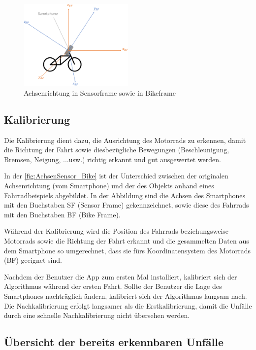 \begin{figure}[htpb]
	\centering
	\includegraphics[width=0.5\textwidth]{Bilder/AchsenSensor_Bike_new_.pdf} 
	\caption{Achsenrichtung in Sensorframe sowie in Bikeframe}
	\label{fig:AchsenSensor_Bike}
\end{figure}
\subsection{Kalibrierung}
Die Kalibrierung dient dazu, die Ausrichtung des Motorrads zu erkennen, damit die Richtung der Fahrt sowie diesbezügliche Bewegungen (Beschleunigung, Bremsen, Neigung, ...usw.) richtig erkannt und gut ausgewertet werden.

In der \autoref{fig:AchsenSensor_Bike} ist der Unterschied zwischen der originalen Achsenrichtung (vom Smartphone) und der des Objekts anhand eines Fahrradbeispiels abgebildet. In der Abbildung sind die Achsen des Smartphones mit den Buchstaben \glqq SF\grqq{} (Sensor Frame) gekennzeichnet, sowie diese des Fahrrads mit den Buchstaben \glqq BF\grqq{} (Bike Frame).

Während der Kalibrierung wird die Position des Fahrrads beziehungsweise Motorrads sowie die Richtung der Fahrt erkannt und die gesammelten Daten aus dem Smartphone so umgerechnet, dass sie fürs Koordinatensystem des Motorrads (BF) geeignet sind.

Nachdem der Benutzer die App zum ersten Mal installiert, kalibriert sich der Algorithmus während der ersten Fahrt. Sollte der Benutzer die Lage des Smartphones nachträglich ändern, kalibriert sich der Algorithmus langsam nach. Die Nachkalibrierung erfolgt langsamer als die Erstkalibrierung, damit die Unfälle durch eine schnelle Nachkalibrierung nicht übersehen werden.



\subsection{Übersicht der bereits erkennbaren Unfälle}

